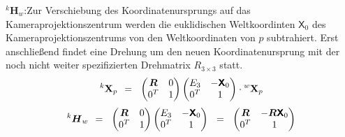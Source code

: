 \noindent$^k\boldsymbol{H}_w$:\quad Zur Verschiebung des Koordinatenursprungs auf das Kameraprojektionszentrum werden die euklidischen Weltkoordinten $\mathsf{X}_0$ des Kameraprojektionszentrums von den Weltkoordinaten von $p$ subtrahiert. Erst anschließend findet eine Drehung um den neuen Koordinatenursprung mit der noch nicht weiter spezifizierten Drehmatrix $R_{3{\times}3}$ statt.
\begin{equation}
	^k\boldsymbol{\mathrm{X}}_p {\:\:}={\:\:} \begin{pmatrix}\boldsymbol{R}&0\\0^T&1\\\end{pmatrix} \begin{pmatrix}E_3&-\boldsymbol{\mathsf{X}}_0\\0^T&1\\\end{pmatrix} \cdot{^w\boldsymbol{\mathrm{X}}_p}
\end{equation}
\begin{equation}
	^k\boldsymbol{H}_w {\:\:}={\:\:} \begin{pmatrix}\boldsymbol{R}&0\\0^T&1\\\end{pmatrix}\begin{pmatrix}E_3&-\boldsymbol{\mathsf{X}}_0\\0^T&1\\\end{pmatrix} {\:\:}={\:\:} \begin{pmatrix}\boldsymbol{R}&-\boldsymbol{R}\boldsymbol{\mathsf{X}}_0\\0^T&1\\\end{pmatrix}
\end{equation}\kleinerabstand

